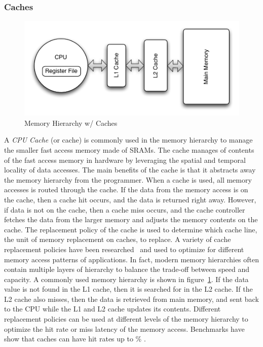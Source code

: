 \subsubsection{Caches}
\begin{figure}
  \vspace{-20pt}
  \begin{center}
    \includegraphics[scale=.5]{figs/conventional_mem_hierarchy}
  \end{center}
  \vspace{-20pt}
  \caption{Memory Hierarchy w/ Caches}
  \label{fig:conventional_mem_hierarchy}
  \vspace{-10pt}
\end{figure}   
A \emph{CPU Cache} (or cache) is commonly used in the memory hierarchy to manage the smaller fast access memory made of SRAMs.
The cache manages of contents of the fast access memory in hardware by leveraging the spatial and temporal locality of data accesses. 
The main benefits of the cache is that it abstracts away the memory hierarchy from the programmer.
When a cache is used, all memory accesses is routed through the cache. 
If the data from the memory access is on the cache, then a cache hit occurs, and the data is returned right away.
However, if data is not on the cache, then a cache miss occurs, and the cache controller fetches the data from the larger memory and adjusts the memory contents on the cache. 
The replacement policy of the cache is used to determine which cache line, the unit of memory replacement on caches, to replace. 
A variety of cache replacement policies have been researched~ and used to optimize for different memory access patterns of applications. 
In fact, modern memory hierarchies often contain multiple layers of hierarchy to balance the trade-off between speed and capacity.
A commonly used memory hierarchy is shown in figure~\ref{fig:conventional_mem_hierarchy}.
If the data value is not found in the L1 cache, then it is searched for in the L2 cache. 
If the L2 cache also misses, then the data is retrieved from main memory, and sent back to the CPU while the L1 and L2 cache updates its contents.
Different replacement policies can be used at different levels of the memory hierarchy to optimize the hit rate or miss latency of the memory access.
Benchmarks have show that caches can have hit rates up to \% . 

